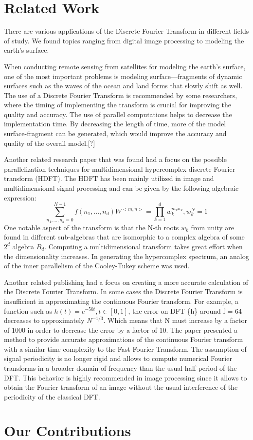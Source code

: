 \documentclass[journal]{IEEEtran}
\begin{document}
\section{Related Work}
\par{There are various applications of the Discrete Fourier Transform in different fields of study. We found topics ranging from digital image processing to modeling the earth's surface.}
\par{When conducting remote sensing from satellites for modeling the earth's surface, one of the most important problems is modeling surface—fragments of dynamic surfaces such as the waves of the ocean and land forms that slowly shift as well. The use of a Discrete Fourier Transform is recommended by some researchers, where the timing of implementing the transform is crucial for improving the quality and accuracy. The use of parallel computations helps to decrease the implementation time. By decreasing the length of time, more of the model surface-fragment can be generated, which would improve the accuracy and quality of the overall model.[?]}
\par{Another related research paper that was found had a focus on the possible parallelization techniques for multidimensional hypercomplex discrete Fourier transform (HDFT). The HDFT has been mainly utilized in image and multidimensional signal processing and can be given by the following algebraic expression:
\[ \sum_{n_1,...,n_d=0}^{N-1} f(n_1,...,n_d)W^{<m,n>} = \prod_{k=1}^{d} w_k^{m_kn_k}, w_k^{N} = 1\]
One notable aspect of the transform is that the N-th roots $w_{k}$ from unity are found in different sub-algebras that are isomorphic to a complex algebra of some $2^{d}$ algebra $B_{d}$. Computing a multidimensional transform takes great effort when the dimensionality increases. In generating the hypercomplex spectrum, an analog of the inner parallelism of the Cooley-Tukey scheme was used.}
\par{Another related publishing had a focus on creating a more accurate calculation of the Discrete Fourier Transform. In some cases the Discrete Fourier Transform is insufficient in approximating the continuous Fourier transform. For example, a function such as $h (t) = e^{-50t}, t\in [0,1]$, the error on DFT \{h\} around f = 64 decreases to approximately $N^{-1/3}$. Which means that N must increase by a factor of 1000 in order to decrease the error by a factor of 10. The paper presented a method to provide accurate approximations of the continuous Fourier transform with a similar time complexity to the Fast Fourier Transform. The assumption of signal periodicity is no longer rigid and allows to compute numerical Fourier transforms in a broader domain of frequency than the usual half-period of the DFT. This behavior is highly recommended in image processing since it allows to obtain the Fourier transform of an image without the usual interference of the periodicity of the classical DFT.}

\section{Our Contributions}



\medskip


\end{document}
